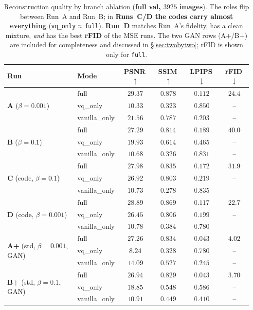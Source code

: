 \documentclass[11pt]{article}
\newcommand{\good}[1]{\textcolor{green!55!black}{#1}}
\newcommand{\bad}[1]{\textcolor{red!70!black}{#1}}
\begin{document}
\begin{table}[h]
\centering
\caption{Reconstruction quality by branch ablation (\textbf{full val, $3925$
images}). The roles flip between Run~A and Run~B; in \textbf{Runs~C/D the codes carry almost
everything} (\texttt{vq\_only}$\approx$\texttt{full}). \textbf{Run~D} matches Run~A's fidelity,
has a clean mixture, \emph{and} has the best \textbf{rFID} of the MSE runs. The two GAN rows
(A+/B+) are included for completeness and discussed in \S\ref{sec:twobytwo}; rFID is shown only
for \texttt{full}.}
\label{tab:ablation}
\begin{tabular}{llcccc}
\toprule
Run & Mode & PSNR\,$\uparrow$ & SSIM\,$\uparrow$ & LPIPS\,$\downarrow$ & rFID\,$\downarrow$\\
\midrule
\multirow{3}{*}{\textbf{A} ($\beta{=}0.001$)}
 & full          & $29.37$ & $0.878$ & $0.112$ & $24.4$\\
 & vq\_only      & \bad{$10.33$} & \bad{$0.323$} & \bad{$0.850$} & --\\
 & vanilla\_only & $21.56$ & $0.787$ & $0.203$ & --\\
\midrule
\multirow{3}{*}{\textbf{B} ($\beta{=}0.1$)}
 & full          & $27.29$ & $0.814$ & $0.189$ & \bad{$40.0$}\\
 & vq\_only      & $19.93$ & $0.614$ & $0.465$ & --\\
 & vanilla\_only & \bad{$10.68$} & \bad{$0.326$} & \bad{$0.831$} & --\\
\midrule
\multirow{3}{*}{\textbf{C} (code, $\beta{=}0.1$)}
 & full          & $27.98$ & $0.835$ & $0.172$ & $31.9$\\
 & vq\_only      & \good{$26.92$} & \good{$0.803$} & \good{$0.219$} & --\\
 & vanilla\_only & \bad{$10.73$} & \bad{$0.278$} & \bad{$0.835$} & --\\
\midrule
\multirow{3}{*}{\textbf{D} (code, $\beta{=}0.001$)}
 & full          & \good{$28.89$} & \good{$0.869$} & \good{$0.117$} & \good{$22.7$}\\
 & vq\_only      & \good{$26.45$} & \good{$0.806$} & \good{$0.199$} & --\\
 & vanilla\_only & \bad{$10.78$} & \bad{$0.384$} & \bad{$0.780$} & --\\
\midrule
\multirow{3}{*}{\textbf{A+} (std, $\beta{=}0.001$, GAN)}
 & full          & $27.26$ & $0.834$ & \good{$0.043$} & \good{$4.02$}\\
 & vq\_only      & \bad{$8.24$} & \bad{$0.328$} & \bad{$0.780$} & --\\
 & vanilla\_only & $14.09$ & $0.527$ & $0.245$ & --\\
\midrule
\multirow{3}{*}{\textbf{B+} (std, $\beta{=}0.1$, GAN)}
 & full          & $26.94$ & $0.829$ & \good{$0.043$} & \good{$3.70$}\\
 & vq\_only      & $18.85$ & $0.548$ & $0.586$ & --\\
 & vanilla\_only & \bad{$10.91$} & \bad{$0.449$} & $0.410$ & --\\
\bottomrule
\end{tabular}
\end{table}
\end{document}
